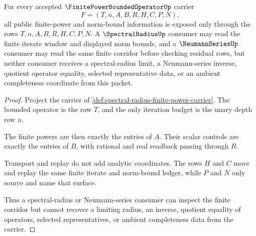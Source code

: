\begin{theorem}
\label{thm:spectral-radius-finite-power-bound}
For every accepted $\FinitePowerBoundedOperatorUp$ carrier
$$
F=(T,n,A,B,R,H,C,P,N),
$$
all public finite-power and norm-bound information is exposed only through the rows $T,n,A,B,R,H,C,P,N$. A $\SpectralRadiusUp$ consumer may read the finite iterate window and displayed norm bounds, and a $\NeumannSeriesUp$ consumer may read the same finite corridor before checking residual rows, but neither consumer receives a spectral-radius limit, a Neumann-series inverse, quotient operator equality, selected representative data, or an ambient completeness coordinate from this packet.
\end{theorem}
\begin{proof}
Project the carrier of \autoref{def:spectral-radius-finite-power-carrier}. The bounded operator is the row $T$, and the only iteration budget is the unary depth row $n$.

The finite powers are then exactly the entries of $A$. Their scalar controls are exactly the entries of $B$, with rational and real readback passing through $R$.

Transport and replay do not add analytic coordinates. The rows $H$ and $C$ move and replay the same finite iterate and norm-bound ledger, while $P$ and $N$ only source and name that surface.

Thus a spectral-radius or Neumann-series consumer can inspect the finite corridor but cannot recover a limiting radius, an inverse, quotient equality of operators, selected representatives, or ambient completeness data from the carrier.
\end{proof}




